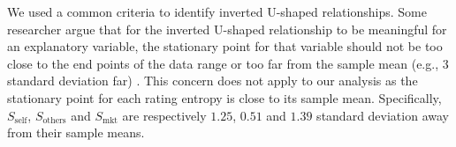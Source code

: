 \documentclass[msom,blindrev]{informs3}
\begin{document}
	
	We used a common criteria to identify inverted U-shaped relationships.  Some researcher argue that for the inverted U-shaped relationship to be meaningful for an explanatory variable, the stationary point for that variable should not be too close to the end points of the data range or too far from the sample mean (e.g., 3 standard deviation far) \citep{lind2010or}. This concern does not apply to our analysis as the stationary point for each rating entropy is close to its sample mean. Specifically, $S_{\text{self}}$, $S_{\text{others}}$ and $S_{\text{mkt}}$ are respectively $1.25$, $0.51$ and $1.39$ standard deviation away from their sample means.
	
	
	
	
	
	
	
	
	
\end{document}
